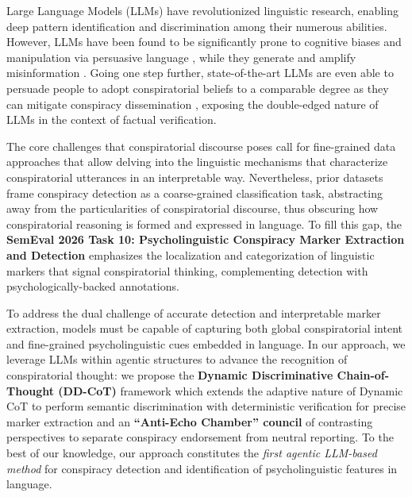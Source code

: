 \documentclass[11pt]{article}
\begin{document}
Large Language Models (LLMs) have revolutionized linguistic research, enabling
deep pattern identification and discrimination among their numerous abilities.
However, LLMs have been found to be significantly prone to cognitive biases
\cite{filandrianos-etal-2025-bias} and manipulation via persuasive language
\cite{xu-etal-2024-earth}, while they generate and amplify misinformation
\cite{chen2024combatingmisinformation}. Going one step further,
state-of-the-art LLMs are even able to persuade people to adopt conspiratorial
beliefs to a comparable degree as they can mitigate conspiracy dissemination
\cite{costello2026largelanguagemodelseffectively}, exposing the double-edged
nature of LLMs in the context of factual verification.

The core challenges that conspiratorial discourse poses call for fine-grained
data approaches that allow delving into the linguistic mechanisms that
characterize conspiratorial utterances in an interpretable way. Nevertheless,
prior datasets \cite{shahsavari2020conspiracy, langguth2023coco} frame
conspiracy detection as a coarse-grained classification task, abstracting away
from the particularities of conspiratorial discourse, thus obscuring how
conspiratorial reasoning is formed and expressed in language. To fill this gap,
the \textbf{SemEval 2026 Task 10: Psycholinguistic Conspiracy Marker Extraction
    and Detection} \cite{samory-etal-2026-semeval, semeval-ws-2026-1} emphasizes the localization and categorization of linguistic
markers that signal conspiratorial thinking, complementing detection with
psychologically-backed annotations.

To address the dual challenge of accurate detection and interpretable marker
extraction, models must be capable of capturing both global conspiratorial
intent and fine-grained psycholinguistic cues embedded in language. In our
approach, we leverage LLMs within agentic structures to advance the recognition
of conspiratorial thought: we propose the \textbf{Dynamic
	Discriminative Chain-of-Thought (DD-CoT)} framework which extends the adaptive
nature of Dynamic CoT \cite{ma2024dynamic} to perform semantic discrimination
with deterministic verification for precise marker extraction and an
\textbf{``Anti-Echo Chamber'' council} of contrasting perspectives to separate
conspiracy endorsement from neutral reporting. To the best of our knowledge, our approach constitutes the \textit{first agentic LLM-based method} for conspiracy
detection and identification of psycholinguistic features in language.
\end{document}
